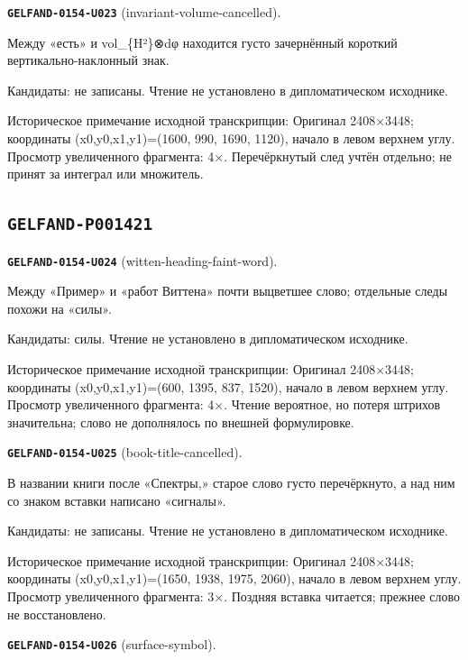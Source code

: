 \par\noindent\leavevmode{}\label{GELFAND-0154-U023}\textbf{\texttt{GELFAND-0154-U023}} (invariant-volume-cancelled).\nopagebreak[4]\par
Между «есть» и vol\_\{H²\}⊗dφ находится густо зачернённый короткий вертикально-наклонный знак.\par
Кандидаты: не записаны. Чтение не установлено в дипломатическом исходнике.\par
Историческое примечание исходной транскрипции: Оригинал 2408×3448; координаты (x0,y0,x1,y1)=(1600, 990, 1690, 1120), начало в левом верхнем углу. Просмотр увеличенного фрагмента: 4×. Перечёркнутый след учтён отдельно; не принят за интеграл или множитель.\par\medskip
\subsection*{\texttt{GELFAND-P001421}}
\par\noindent\leavevmode{}\label{GELFAND-0154-U024}\textbf{\texttt{GELFAND-0154-U024}} (witten-heading-faint-word).\nopagebreak[4]\par
Между «Пример» и «работ Виттена» почти выцветшее слово; отдельные следы похожи на «силы».\par
Кандидаты: силы. Чтение не установлено в дипломатическом исходнике.\par
Историческое примечание исходной транскрипции: Оригинал 2408×3448; координаты (x0,y0,x1,y1)=(600, 1395, 837, 1520), начало в левом верхнем углу. Просмотр увеличенного фрагмента: 4×. Чтение вероятное, но потеря штрихов значительна; слово не дополнялось по внешней формулировке.\par\medskip
\par\noindent\leavevmode{}\label{GELFAND-0154-U025}\textbf{\texttt{GELFAND-0154-U025}} (book-title-cancelled).\nopagebreak[4]\par
В названии книги после «Спектры,» старое слово густо перечёркнуто, а над ним со знаком вставки написано «сигналы».\par
Кандидаты: не записаны. Чтение не установлено в дипломатическом исходнике.\par
Историческое примечание исходной транскрипции: Оригинал 2408×3448; координаты (x0,y0,x1,y1)=(1650, 1938, 1975, 2060), начало в левом верхнем углу. Просмотр увеличенного фрагмента: 3×. Поздняя вставка читается; прежнее слово не восстановлено.\par\medskip
\par\noindent\leavevmode{}\label{GELFAND-0154-U026}\textbf{\texttt{GELFAND-0154-U026}} (surface-symbol).\nopagebreak[4]\par

